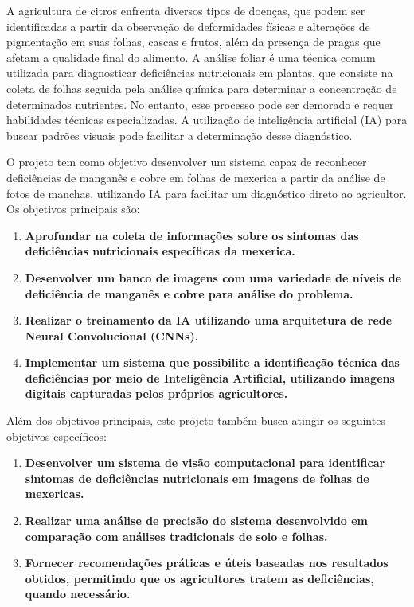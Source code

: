 A agricultura de citros enfrenta diversos tipos de doenças, que podem ser identificadas a partir da observação de deformidades físicas e alterações de pigmentação em suas folhas, cascas e frutos, além da presença de pragas que afetam a qualidade final do alimento. A análise foliar é uma técnica comum utilizada para diagnosticar deficiências nutricionais em plantas, que consiste na coleta de folhas seguida pela análise química para determinar a concentração de determinados nutrientes. No entanto, esse processo pode ser demorado e requer habilidades técnicas especializadas. A utilização de inteligência artificial (IA) para buscar padrões visuais pode facilitar a determinação desse diagnóstico.

O projeto tem como objetivo desenvolver um sistema capaz de reconhecer deficiências de manganês e cobre em folhas de mexerica a partir da análise de fotos de manchas, utilizando IA para facilitar um diagnóstico direto ao agricultor. Os objetivos principais são:
\begin{enumerate} 
\item \textbf{Aprofundar na coleta de informações sobre os sintomas das deficiências nutricionais específicas da mexerica.} 
\item \textbf{Desenvolver um banco de imagens com uma variedade de níveis de deficiência de manganês e cobre para análise do problema.} \item \textbf{Realizar o treinamento da IA utilizando uma arquitetura de rede Neural Convolucional (CNNs).} 
\item \textbf{Implementar um sistema que possibilite a identificação técnica das deficiências por meio de Inteligência Artificial, utilizando imagens digitais capturadas pelos próprios agricultores.} 
\end{enumerate}

Além dos objetivos principais, este projeto também busca atingir os seguintes objetivos específicos:

\begin{enumerate} 
\item \textbf{Desenvolver um sistema de visão computacional para identificar sintomas de deficiências nutricionais em imagens de folhas de mexericas.} 
\item \textbf{Realizar uma análise de precisão do sistema desenvolvido em comparação com análises tradicionais de solo e folhas.} 
\item \textbf{Fornecer recomendações práticas e úteis baseadas nos resultados obtidos, permitindo que os agricultores tratem as deficiências, quando necessário.} \end{enumerate}